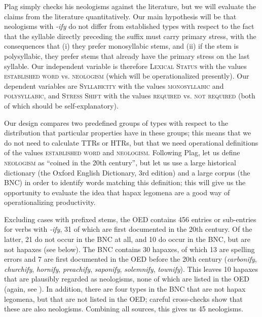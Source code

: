 Plag simply checks his neologisms  against the literature, but we will evaluate the claims from the literature quantitatively.  Our main hypothesis will be that neologisms with \textit{-ify} do not differ from established types  with respect to the fact that the syllable  directly preceding the suffix  must carry primary stress, with the consequences that (i) they prefer monosyllabic stems,  and (ii) if the stem  is polysyllabic, they prefer stems that already have the primary stress on the last syllable. Our independent variable is therefore \textsc{Lexical Status} with the values \textsc{established word} vs. \textsc{neologism}  (which will be operationalized  presently). Our dependent variables are \textsc{Syllabicity}  with the values \textsc{monosyllabic} and \textsc{polysyllabic}, and \textsc{Stress Shift} with the values \textsc{required} vs. \textsc{not required} (both of which should be self\hyp{}explanatory).

Our design  compares two predefined groups of types  with respect to the distribution  that particular properties have in these groups; this means that we do not need to calculate TTRs  or HTRs,  but that we need operational  definitions of the values \textsc{established word} and \textsc{neologism}.  Following Plag, let us define \textsc{neologism} as ``coined in the 20th century'', but let us use a large historical dictionary  (the Oxford English Dictionary,  3rd edition) and a large  corpus (the BNC)  in order to identify words matching this definition; this will give us the opportunity to evaluate the idea that hapax  legomena are a good way of operationalizing  productivity.

Excluding cases with prefixed  stems,  the OED  contains 456 entries or sub\hyp{}entries for verbs  with \textit{-ify}, 31 of which are first documented in the 20th century. Of the latter, 21 do not occur in the BNC  at all, and 10 do occur in the BNC, but are not hapaxes  (see  below). The BNC contains 30 hapaxes, of which 13 are spelling errors and 7 are first documented in the OED  before the 20th century (\textit{carbonify}, \textit{churchify}, \textit{hornify}, \textit{preachify}, \textit{saponify}, \textit{solemnify}, \textit{townify}). This leaves 10 hapaxes that are plausibly regarded as neologisms,  none of which are listed in the OED  (again, see ). In addition, there are four types  in the BNC  that are not hapax  legomena, but that are not listed in the OED;  careful cross\hyp{}checks show that these are also neologisms. Combining all sources, this gives us 45 neologisms.

